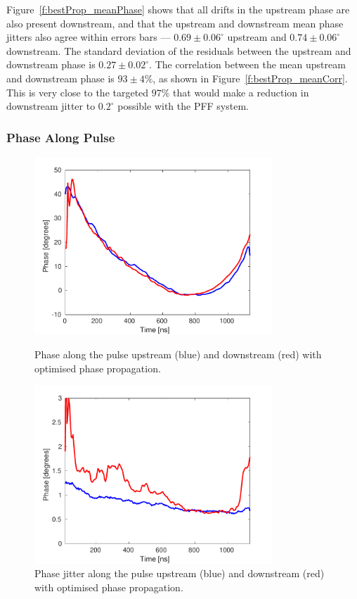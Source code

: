 Figure~\ref{f:bestProp_meanPhase} shows that all drifts in the upstream phase are also present downstream, and that the upstream and downstream mean phase jitters also agree within errors bars --- \(0.69\pm0.06^\circ\) upstream and \(0.74\pm0.06^\circ\) downstream. The standard deviation of the residuals between the upstream and downstream phase is \(0.27\pm0.02^\circ\).%
The correlation between the mean upstream and downstream phase is \(93\pm4\%\), as shown in Figure~\ref{f:bestProp_meanCorr}. This is very close to the targeted \(97\%\) that would make a reduction in downstream jitter to \(0.2^\circ\) possible with the PFF system.


\subsubsection{Phase Along Pulse}

\begin{figure}
  \centering
  \includegraphics[width=0.8\textwidth]{Figures/propagation/bestProp_meanAlong}
  \caption{Phase along the pulse upstream (blue) and downstream (red) with optimised phase propagation.}
  \label{f:bestProp_meanAlong}
  \includegraphics[width=0.8\textwidth]{Figures/propagation/bestProp_jitAlong}
  \caption{Phase jitter along the pulse upstream (blue) and downstream (red) with optimised phase propagation.}
  \label{f:bestProp_jitAlong}
\end{figure}

